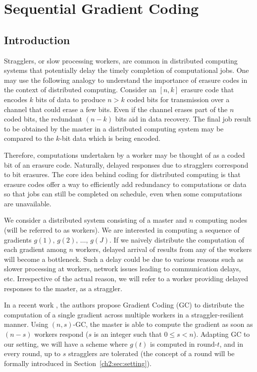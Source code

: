 \chapter{Sequential Gradient Coding}\label{ch:sgc}

\section{Introduction}\label{ch2:sec:intro}

Stragglers, or slow processing workers, are common in distributed computing systems that potentially delay the timely completion of computational jobs.  One may use the following analogy to understand the importance of erasure codes in the context of distributed computing. Consider an $[n,k]$ erasure code that encodes $k$ bits of data to produce $n>k$ coded bits for transmission over a channel that could erase a few bits. Even if the channel erases part of the $n$ coded bits, the redundant $(n-k)$ bits aid in data recovery. The final job result to be obtained by the master in a distributed computing system may be compared to the $k$-bit data which is being encoded.

Therefore, computations undertaken by a worker may be thought of as a coded bit of an erasure code. Naturally, delayed responses due to stragglers correspond to bit erasures. The core idea behind coding for distributed computing is that erasure codes offer a way to efficiently add redundancy to computations or data so that jobs can still be completed on schedule, even when some computations are unavailable.

We consider a distributed system consisting of a master and $n$ computing nodes (will be referred to as workers). We are interested in computing a sequence of gradients $g(1), \, g(2), \, \ldots, \, g(J)$. If we naively distribute the computation of each gradient among $n$ workers, delayed arrival of results from any of the workers will become a bottleneck. Such a delay could be due to various reasons such as slower processing at workers, network issues leading to communication delays, etc. Irrespective of the actual reason, we will refer to a worker providing delayed responses to the master, as a straggler. 

In a recent work \cite{grad_coding}, the authors propose Gradient Coding (GC) to distribute the computation of a single gradient across multiple workers in a straggler-resilient manner. Using $(n,s)$-GC, the master is able to compute the gradient as soon as $(n-s)$ workers respond ($s$ is an integer such that $0\leq s<n$). Adapting GC to our setting, we will have a scheme where $g(t)$ is computed in round-$t$, and in every round, up to $s$ stragglers are tolerated (the concept of a round will be formally introduced in Section~\ref{ch2:sec:setting}).

